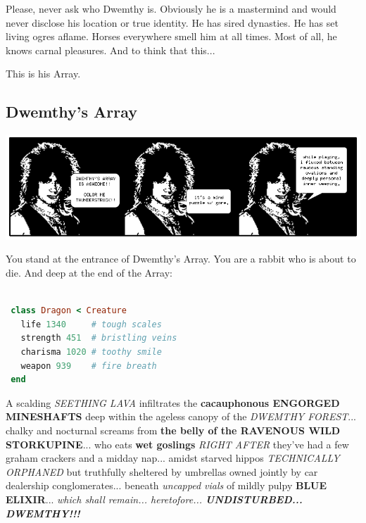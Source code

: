 \documentclass[10pt,twoside]{report}
\begin{document}
Please, never ask who Dwemthy is. Obviously he is a mastermind and
would never disclose his location or true identity. He has sired
dynasties. He has set living ogres aflame. Horses everywhere smell him
at all times. Most of all, he knows carnal pleasures. And to think
that this...

This is his Array.



\subsection{Dwemthy's Array}



	\includegraphics[width=1.0\textwidth]{cache/62.png}

You stand at the entrance of Dwemthy's Array.  You are a rabbit who is
about to die. And deep at the end of the Array:


\begin{lstlisting}[basicstyle=\ttfamily\color{basiccolor},
    commentstyle = \ttfamily\color{commentcolor},
    keywordstyle=\ttfamily\color{keywordscolor},
    stringstyle=\color{stringcolor},
    language=Ruby,
    basicstyle=\small\ttfamily,
    showstringspaces=false,
  ]

 class Dragon < Creature
   life 1340     # tough scales
   strength 451  # bristling veins
   charisma 1020 # toothy smile
   weapon 939    # fire breath
 end

\end{lstlisting}


A scalding {\em SEETHING LAVA} infiltrates the {\bf cacauphonous
  ENGORGED MINESHAFTS} deep within the ageless canopy of the {\em
  DWEMTHY FOREST}... chalky and nocturnal screams from {\bf the belly
  of the RAVENOUS WILD STORKUPINE}... who eats {\bf wet goslings} {\em
  RIGHT AFTER} they've had a few graham crackers and a midday
nap... amidst starved hippos {\em TECHNICALLY ORPHANED} but truthfully
sheltered by umbrellas owned jointly by car dealership
conglomerates... beneath {\em uncapped vials} of mildly pulpy {\bf
  BLUE ELIXIR}... {\em which shall remain... heretofore... {\bf
    UNDISTURBED... DWEMTHY!!!}}
\end{document}

